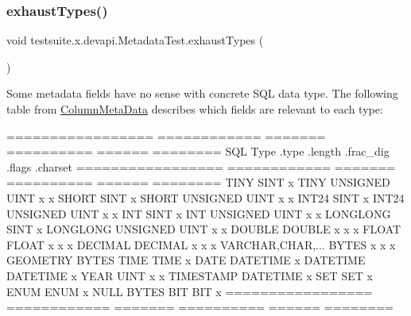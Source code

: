 \subsubsection{\texorpdfstring{exhaust\+Types()}{exhaustTypes()}}
{\footnotesize\ttfamily void testsuite.\+x.\+devapi.\+Metadata\+Test.\+exhaust\+Types (\begin{DoxyParamCaption}{ }\end{DoxyParamCaption})}

Some metadata fields have no sense with concrete S\+QL data type. The following table from \mbox{\hyperlink{}{Column\+Meta\+Data}} describes which fields are relevant to each type\+:


\begin{DoxyPre}
    ================= ============ ======= ========== ====== ========
    SQL Type          .type        .length .frac\_dig  .flags .charset
    ================= ============ ======= ========== ====== ========
    TINY              SINT         x
    TINY UNSIGNED     UINT         x                  x
    SHORT             SINT         x
    SHORT UNSIGNED    UINT         x                  x
    INT24             SINT         x
    INT24 UNSIGNED    UINT         x                  x
    INT               SINT         x
    INT UNSIGNED      UINT         x                  x
    LONGLONG          SINT         x
    LONGLONG UNSIGNED UINT         x                  x
    DOUBLE            DOUBLE       x       x          x
    FLOAT             FLOAT        x       x          x
    DECIMAL           DECIMAL      x       x          x
    VARCHAR,CHAR,...  BYTES        x                  x      x
    GEOMETRY          BYTES
    TIME              TIME         x
    DATE              DATETIME     x
    DATETIME          DATETIME     x
    YEAR              UINT         x                  x
    TIMESTAMP         DATETIME     x
    SET               SET                                    x
    ENUM              ENUM                                   x
    NULL              BYTES
    BIT               BIT          x
    ================= ============ ======= ========== ====== ========
\end{DoxyPre}
 \mbox{\label{classtestsuite_1_1x_1_1devapi_1_1_metadata_test_a63df98020bbc9bb39c55754d5607b531}} 
